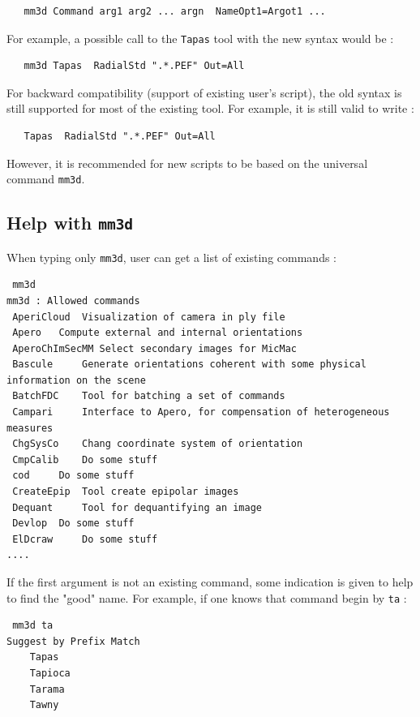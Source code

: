 \begin{verbatim}
   mm3d Command arg1 arg2 ... argn  NameOpt1=Argot1 ...
\end{verbatim}

For example, a possible call to the {\tt Tapas} tool with the new syntax would be :

\begin{verbatim}
   mm3d Tapas  RadialStd ".*.PEF" Out=All
\end{verbatim}


For backward compatibility (support of existing user's script), the old syntax is still supported
for most of the existing tool. For example, it is still valid to write :

\begin{verbatim}
   Tapas  RadialStd ".*.PEF" Out=All
\end{verbatim}

However, it is recommended for new scripts to be based on the universal command {\tt mm3d}.



\subsection{Help with {\tt mm3d}}

When typing only {\tt mm3d}, user can get a list of existing commands :


\begin{verbatim}
 mm3d
mm3d : Allowed commands
 AperiCloud	 Visualization of camera in ply file
 Apero	 Compute external and internal orientations
 AperoChImSecMM	Select secondary images for MicMac
 Bascule	 Generate orientations coherent with some physical information on the scene
 BatchFDC	 Tool for batching a set of commands
 Campari	 Interface to Apero, for compensation of heterogeneous measures
 ChgSysCo	 Chang coordinate system of orientation
 CmpCalib	 Do some stuff
 cod	 Do some stuff
 CreateEpip	 Tool create epipolar images
 Dequant	 Tool for dequantifying an image
 Devlop	 Do some stuff
 ElDcraw	 Do some stuff
....
\end{verbatim}

If the first argument is not an existing command, some indication is given to help to find
the "good" name. For example, if one knows that command begin by {\tt ta}  :

\begin{verbatim}
 mm3d ta
Suggest by Prefix Match
    Tapas
    Tapioca
    Tarama
    Tawny
\end{verbatim}

